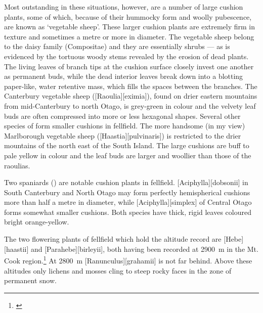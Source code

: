 Most outstanding in these situations, however, are a number of large cushion plants, some of which, because of their hummocky form and woolly pubescence, are known as `vegetable sheep'.
These larger cushion plants are extremely firm in texture and sometimes a metre or more in diameter.
The vegetable sheep belong to the daisy family (Compositae) and they are essentially shrubs --- as is evidenced by the tortuous woody stems revealed by the erosion of dead plants.
The living leaves of branch tips at the cushion surface closely invest one another as permanent buds, while the dead interior leaves break down into a blotting paper-like, water retentive mass, which fills the spaces between the branches.
The Canterbury vegetable sheep ([Raoulia][eximia]), found on drier eastern mountains from mid-Canterbury to north Otago, is grey-green in colour and the velvety leaf buds are often compressed into more or less hexagonal shapes.
Several other species of  form smaller cushions in fellfield.
The more handsome (in my view) Marlborough vegetable sheep ([Haastia][pulvinaris]) is restricted to the drier mountains of the north east of the South Island.
The large cushions are buff to pale yellow in colour and the leaf buds are larger and woollier than those of the raoulias.

Two spaniards () are notable cushion plants in fellfield. [Aciphylla][dobsonii] in South Canterbury and North Otago may form perfectly hemispherical cushions more than half a metre in diameter, while [Aciphylla][simplex] of Central Otago forms somewhat smaller cushions.
Both species have thick, rigid leaves coloured bright orange-yellow.

The two flowering plants of fellfield which hold the altitude record are [Hebe][haastii] and [Parahebe][birleyii], both having been recorded at \SI{2900}{\metre} in the Mt.
Cook region.\footnote{\cite{wilson1978wild}}
At \SI{2800}{\metre} [Ranunculus][grahamii] is not far behind.
Above these altitudes only lichens and mosses cling to steep rocky faces in the zone of permanent snow.

